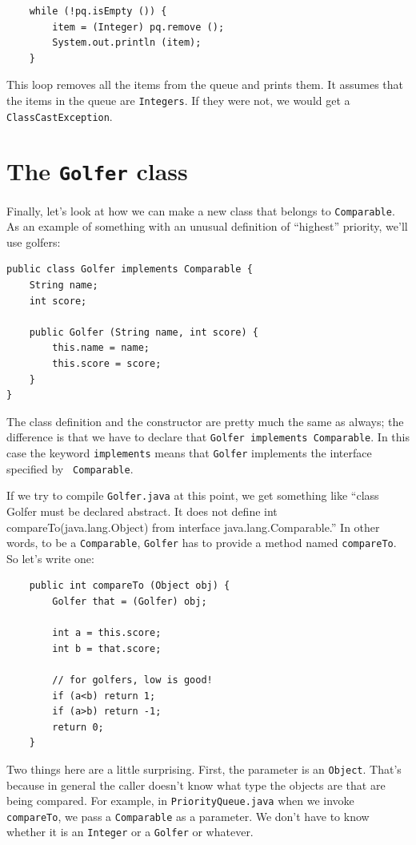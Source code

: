 \documentclass[12pt]{book}
\theoremstyle{exercise}
\begin{document}
\begin{verbatim}
    while (!pq.isEmpty ()) {
        item = (Integer) pq.remove ();
        System.out.println (item);
    }
\end{verbatim}
%
This loop removes all the items from the queue and prints them.
It assumes that the items in the queue are {\tt Integers}.
If they were not, we would get a {\tt ClassCastException}.


\section{The {\tt Golfer} class}

Finally, let's look at how we can make a new class that belongs to
{\tt Comparable}.  As an example of something with an unusual definition
of ``highest'' priority, we'll use golfers:

\begin{verbatim}
public class Golfer implements Comparable {
    String name;
    int score;

    public Golfer (String name, int score) {
        this.name = name;
        this.score = score;
    }
}
\end{verbatim}
%
The class definition and the constructor are pretty much the same as
always; the difference is that we have to declare that {\tt Golfer
implements Comparable}.  In this case the keyword {\tt implements}
means that {\tt Golfer} implements the interface specified by {\tt
Comparable}.

If we try to compile {\tt Golfer.java} at
this point, we get something like ``class Golfer must be declared
abstract. It does not define int compareTo(java.lang.Object) from
interface java.lang.Comparable.''  In other words, to be a {\tt Comparable},
{\tt Golfer} has to provide a method named {\tt compareTo}.  So
let's write one:

\begin{verbatim}
    public int compareTo (Object obj) {
        Golfer that = (Golfer) obj;

        int a = this.score;
        int b = that.score;
	
        // for golfers, low is good!
        if (a<b) return 1;
        if (a>b) return -1;
        return 0;
    }
\end{verbatim}
%
Two things here are a little surprising.  First, the parameter
is an {\tt Object}.  That's because in general the caller doesn't
know what type the objects are that are being compared.  For
example, in {\tt PriorityQueue.java} when we invoke {\tt compareTo},
we pass a {\tt Comparable} as a parameter.  We don't have to
know whether it is an {\tt Integer} or a {\tt Golfer} or whatever.
\end{document}
